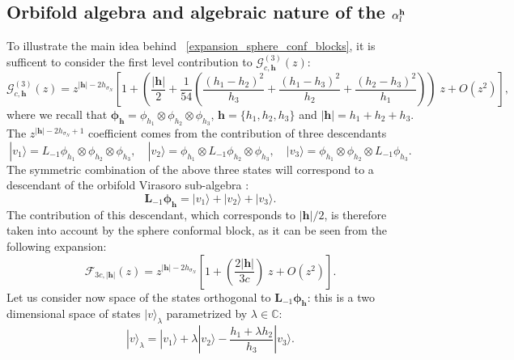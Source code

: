\documentclass[a4paper,11pt]{article}
\begin{document}
\subsection{Orbifold algebra and algebraic nature of the $\alpha_{l}^{{\it {\bf h}}}$} 
\label{deralpha}
To illustrate the main idea behind ~\eqref{expansion_sphere_conf_blocks}, it is sufficent to consider the first level contribution to  $\mathcal{G}_{c, \boldsymbol{h}}^{(3)}(z)$:
\begin{equation}
\mathcal{G}_{c, \boldsymbol{h}}^{(3)}(z)= z^{|\boldsymbol{h}|-2h_{\sigma_N}}\left[1+\left(\frac{|\boldsymbol{h}|}{2}+\frac{1}{54}\left(\frac{(h_1-h_2)^2}{h_3}+\frac{(h_1-h_3)^2}{h_2}+\frac{(h_2-h_3)^2}{h_1}\right)\right)\;z+O(z^2)\right],
\end{equation}
where we recall that  $\boldsymbol{\phi}_{\boldsymbol{h}}=\phi_{h_1}\otimes \phi_{h_2}\otimes \phi_{h_3} $,    $\boldsymbol{h}=\{h_1,h_2,h_3\}$ and $|\boldsymbol{h}|=h_1+h_2+h_3$. The $z^{|\boldsymbol{h}|-2h_{\sigma_N}+1}$ coefficient comes from the contribution of three descendants
\begin{equation}
|v_1\rangle =L_{-1}\phi_{h_1}\otimes \phi_{h_2}\otimes \phi_{h_3},   \quad |v_2\rangle =\phi_{h_1}\otimes  L_{-1}\phi_{h_2}\otimes \phi_{h_3},\quad |v_3\rangle=\phi_{h_1}\otimes \phi_{h_2}\otimes  L_{-1} \phi_{h_3}.
\end{equation}
The symmetric combination of the above three states will correspond to a descendant of the orbifold Virasoro sub-algebra :
\begin{equation}
\boldsymbol{L}_{-1}\boldsymbol{\phi}_{\boldsymbol{h}}=|v_1\rangle+|v_2\rangle+|v_3\rangle.
\end{equation} 
The contribution of this descendant, which corresponds to $|\boldsymbol{h}|/2 $, is therefore taken into account by the sphere conformal block, as it can be seen from the following expansion: 
\begin{equation}
\mathcal{F}_{3c, |\boldsymbol{h}|}(z)=z^{|\boldsymbol{h}|-2h_{\sigma_N}}\left[1+\left(\frac{2|\boldsymbol{h}|}{ 3 c}\right)\;z+O(z^2)\right].
\end{equation}
Let us consider now  space of the states orthogonal to $\boldsymbol{L}_{-1}\boldsymbol{\phi}_{\boldsymbol{h}}$: this is a two dimensional space of states $|v\rangle_{\lambda}$ parametrized by $\lambda \in \mathbb{C}$:
\begin{equation}
\label{ortosub}
 |v\rangle_{\lambda}= |v_1\rangle+\lambda |v_2\rangle
 -\frac{h_1+\lambda h_2}{h_3} |v_3\rangle.
\end{equation}
\end{document}
